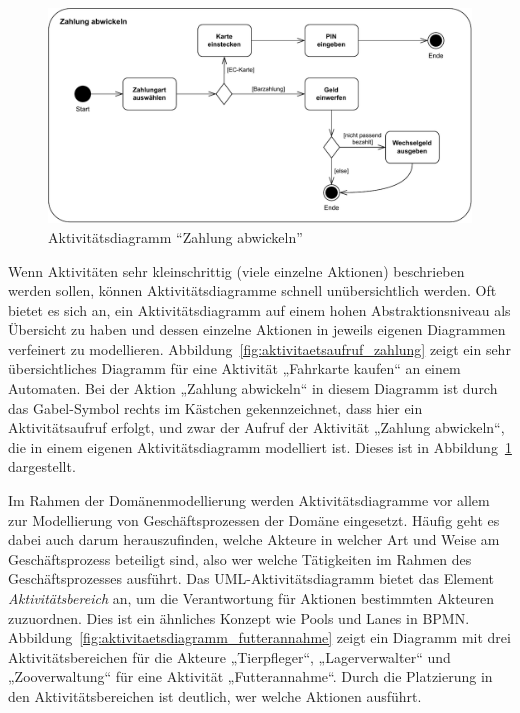 \begin{figure}[h!]
	\centering
	\includegraphics[scale=0.7]{Bilder/Kapitel-5/aktivitaetsdiagramm_zahlung_abwickeln.pdf}
	\caption{Aktivitätsdiagramm "`Zahlung abwickeln"'}
	\label{fig:aktivitaetsdiagramm_zahlung_abwickeln}
\end{figure}

Wenn Aktivitäten sehr kleinschrittig (viele einzelne Aktionen) beschrieben werden sollen, können Aktivitätsdiagramme schnell unübersichtlich werden. Oft bietet es sich an, ein Aktivitätsdiagramm auf einem hohen Abstraktionsniveau als Übersicht zu haben und dessen einzelne Aktionen in jeweils eigenen Diagrammen verfeinert zu modellieren. Abbildung~\ref{fig:aktivitaetsaufruf_zahlung} zeigt ein sehr übersichtliches Diagramm für eine Aktivität „Fahrkarte kaufen“ an einem Automaten. Bei der Aktion „Zahlung abwickeln“ in diesem Diagramm ist durch das Gabel-Symbol rechts im Kästchen gekennzeichnet, dass hier ein Aktivitätsaufruf erfolgt, und zwar der Aufruf der Aktivität „Zahlung abwickeln“, die in einem eigenen Aktivitätsdiagramm modelliert ist. Dieses ist in Abbildung~\ref{fig:aktivitaetsdiagramm_zahlung_abwickeln} dargestellt.
 
\pagebreak %

Im Rahmen der Domänenmodellierung werden Aktivitätsdiagramme vor allem zur Modellierung von Geschäftsprozessen der Domäne eingesetzt. Häufig geht es dabei auch darum herauszufinden, welche Akteure in welcher Art und Weise am Geschäftsprozess beteiligt sind, also wer welche Tätigkeiten im Rahmen des Geschäfts\-prozesses ausführt. Das UML-Aktivitätsdiagramm bietet das Element \textit{Aktivitäts\-bereich} an, um die Verantwortung für Aktionen bestimmten Akteuren zuzuordnen. Dies ist ein ähnliches Konzept wie Pools und Lanes in BPMN. Abbildung~\ref{fig:aktivitaetsdiagramm_futterannahme} zeigt ein Diagramm mit drei Aktivitätsbereichen für die Akteure „Tierpfleger“, „Lager\-verwalter“ und „Zooverwaltung“ für eine Aktivität „Futterannahme“. Durch die Platzierung in den Aktivitätsbereichen ist deutlich, wer welche Aktionen ausführt.
  

